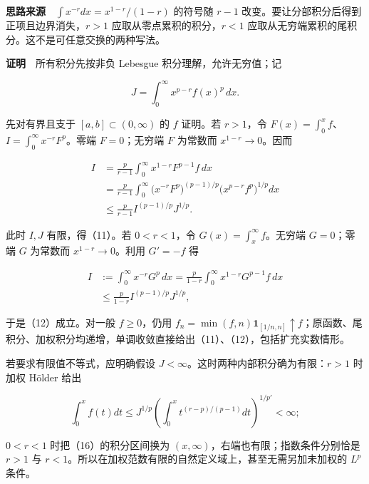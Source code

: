 \documentclass[11pt,a4paper]{article}
\begin{document}
\textbf{思路来源}　\(\int x^{-r}dx=x^{1-r}/(1-r)\) 的符号随 \(r-1\)
改变。要让分部积分后得到正项且边界消失，\(r>1\)
应取从零点累积的积分，\(r<1\)
应取从无穷端累积的尾积分。这不是可任意交换的两种写法。

\textbf{证明}　所有积分先按非负 Lebesgue 积分理解，允许无穷值；记

\begin{equation}
J=\int_0^\infty x^{p-r}f(x)^p\,dx.
\tag{13}
\end{equation}

先对有界且支于 \([a,b]\subset(0,\infty)\) 的 \(f\) 证明。若 \(r>1\)，令
\(F(x)=\int_0^x f\)、\(I=\int_0^\infty x^{-r}F^p\)。零端 \(F=0\)；无穷端
\(F\) 为常数而 \(x^{1-r}\to0\)。因而

\begin{equation}
\begin{aligned}
I&=\frac p{r-1}\int_0^\infty x^{1-r}F^{p-1}f\,dx\\
&=\frac p{r-1}\int_0^\infty
\bigl(x^{-r}F^p\bigr)^{(p-1)/p}
\bigl(x^{p-r}f^p\bigr)^{1/p}dx\\
&\le\frac p{r-1}I^{(p-1)/p}J^{1/p}.
\end{aligned}
\tag{14}
\end{equation}

此时 \(I,J\) 有限，得（11）。若 \(0<r<1\)，令
\(G(x)=\int_x^\infty f\)。无穷端 \(G=0\)；零端 \(G\) 为常数而
\(x^{1-r}\to0\)。利用 \(G'=-f\) 得

\begin{equation}
\begin{aligned}
I&:=\int_0^\infty x^{-r}G^p\,dx
=\frac p{1-r}\int_0^\infty x^{1-r}G^{p-1}f\,dx\\
&\le\frac p{1-r}I^{(p-1)/p}J^{1/p},
\end{aligned}
\tag{15}
\end{equation}

于是（12）成立。对一般 \(f\ge0\)，仍用
\(f_n=\min(f,n)\mathbf1_{[1/n,n]}\uparrow f\)；原函数、尾积分、加权积分均递增，单调收敛直接给出（11）、（12），包括扩充实数情形。

若要求有限值不等式，应明确假设
\(J<\infty\)。这时两种内部积分确为有限：\(r>1\) 时加权 Hölder 给出

\begin{equation}
\int_0^x f(t)dt\le J^{1/p}
\left(\int_0^x t^{(r-p)/(p-1)}dt\right)^{1/p'}<\infty;
\tag{16}
\end{equation}

\(0<r<1\) 时把（16）的积分区间换为
\((x,\infty)\)，右端也有限；指数条件分别恰是 \(r>1\) 与
\(r<1\)。所以在加权范数有限的自然定义域上，甚至无需另加未加权的 \(L^p\)
条件。
\end{document}
